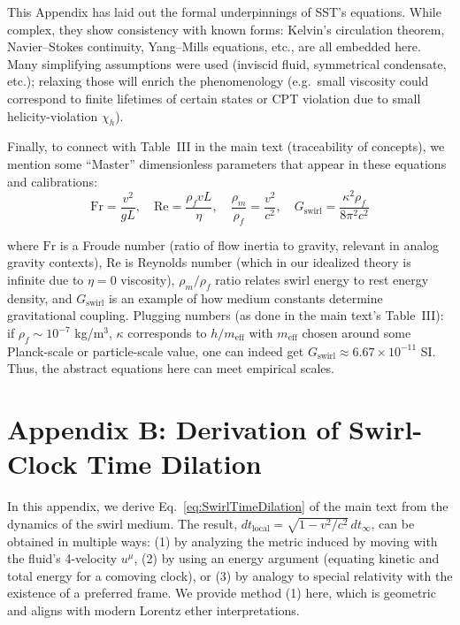 \documentclass[10pt,reprint,aps,onecolumn,nofootinbib]{revtex4-2}
\newcommand{\rhoF}{\rho_{\!f}}     %
\newcommand{\rhoM}{\rho_{\!m}}     %
\begin{document}
This Appendix has laid out the formal underpinnings of SST’s equations. While complex, they show consistency with known forms: Kelvin’s circulation theorem, Navier–Stokes continuity, Yang–Mills equations, etc., are all embedded here. Many simplifying assumptions were used (inviscid fluid, symmetrical condensate, etc.); relaxing those will enrich the phenomenology (e.g.\ small viscosity could correspond to finite lifetimes of certain states or CPT violation due to small helicity-violation $\chi_h$).

Finally, to connect with Table~III in the main text (traceability of concepts), we mention some “Master” dimensionless parameters that appear in these equations and calibrations:
\begin{equation}
\mathrm{Fr} = \frac{v^2}{gL}, \quad
\mathrm{Re} = \frac{\rhoF vL}{\eta}, \quad
\frac{\rhoM}{\rhoF} = \frac{v^2}{c^2}, \quad
G_{\text{swirl}} = \frac{\kappa^2 \rhoF}{8\pi^2 c^2}\label{eq:MasterParams}
\end{equation}

where $\mathrm{Fr}$ is a Froude number (ratio of flow inertia to gravity, relevant in analog gravity contexts), $\mathrm{Re}$ is Reynolds number (which in our idealized theory is infinite due to $\eta=0$ viscosity), $\rhoM/\rhoF$ ratio relates swirl energy to rest energy density, and $G_{\text{swirl}}$ is an example of how medium constants determine gravitational coupling. Plugging numbers (as done in the main text’s Table~III): if $\rhoF \sim 10^{-7}$ kg/m$^3$, $\kappa$ corresponds to $h/m_{\mathrm{eff}}$ with $m_{\mathrm{eff}}$ chosen around some Planck-scale or particle-scale value, one can indeed get $G_{\text{swirl}} \approx 6.67\times10^{-11}$ SI. Thus, the abstract equations here can meet empirical scales.


\section*{Appendix B: Derivation of Swirl-Clock Time Dilation}


In this appendix, we derive Eq.~\eqref{eq:SwirlTimeDilation} of the main text from the dynamics of the swirl medium. The result, $dt_{\text{local}} = \sqrt{1-v^2/c^2}\, dt_{\infty}$, can be obtained in multiple ways: (1) by analyzing the metric induced by moving with the fluid’s 4-velocity $u^\mu$, (2) by using an energy argument (equating kinetic and total energy for a comoving clock), or (3) by analogy to special relativity with the existence of a preferred frame. We provide method (1) here, which is geometric and aligns with modern Lorentz ether interpretations.
\end{document}
